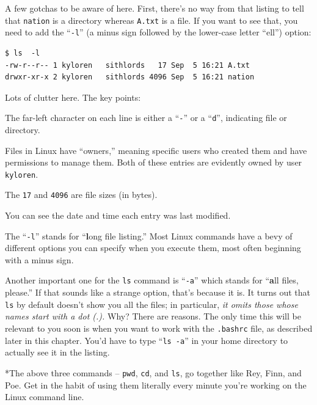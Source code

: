 \begin{enumerate}
A few gotchas to be aware of here. First, there's no way from that listing to
tell that \texttt{nation} is a directory whereas \texttt{A.txt} is a file. If
you want to see that, you need to add the ``\texttt{-l}'' (a minus sign
followed by the lower-case letter ``ell'') option:

\begin{Verbatim}[fontsize=\small]
$ ls  -l
-rw-r--r-- 1 kyloren   sithlords   17 Sep  5 16:21 A.txt
drwxr-xr-x 2 kyloren   sithlords 4096 Sep  5 16:21 nation
\end{Verbatim}

Lots of clutter here. The key points:

\begin{compactitem}[-]
\item The far-left character on each line is either a ``\texttt{-}'' or a
``\texttt{d}'', indicating file or directory.
\item Files in Linux have ``owners,'' meaning specific users who created them
and have permissions to manage them. Both of these entries are evidently owned
by user \texttt{kyloren}.
\item The \texttt{17} and \texttt{4096} are file sizes (in bytes).
\item You can see the date and time each entry was last modified.
\end{compactitem}

The ``\texttt{-l}'' stands for ``\textbf{l}ong file listing.'' Most Linux
commands have a bevy of different options you can specify when you execute
them, most often beginning with a minus sign.

Another important one for the \texttt{ls} command is ``\texttt{-a}'' which
stands for ``\textbf{a}ll files, please.'' If that sounds like a strange
option, that's because it is. It turns out that \texttt{ls} by default doesn't
show you all the files; in particular, \textit{it omits those whose names
start with a dot (.).} Why? There are reasons. The only time this will be
relevant to you soon is when you want to work with the \texttt{.bashrc} file,
as described later in this chapter. You'd have to type ``\texttt{ls -a}'' in
your home directory to actually see it in the listing.


\bigline
\vspace{.1in}
*The above three commands -- \texttt{pwd}, \texttt{cd}, and \texttt{ls}, go
together like Rey, Finn, and Poe. Get in the habit of using them literally
every minute you're working on the Linux command line.
\vspace{.1in}
\bigline


\end{enumerate}

